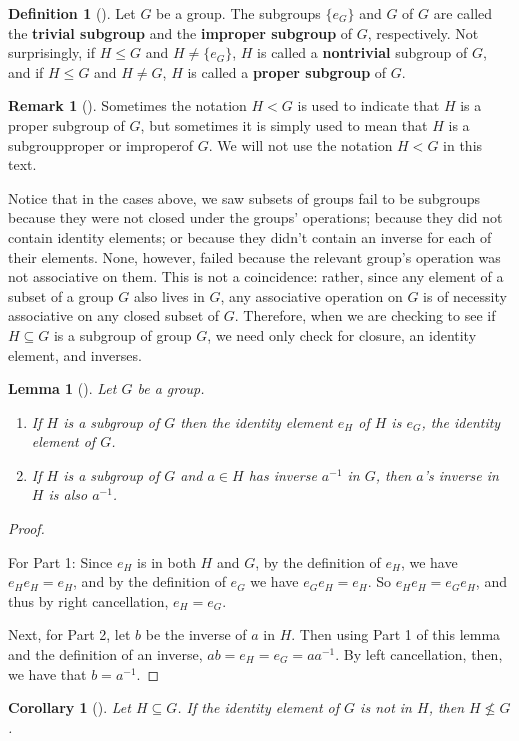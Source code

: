 \documentclass[10pt,openany,oneside]{book}
\newcommand{\terminology}[1]{\textbf{#1}}
\theoremstyle{plain}
\newtheorem{corollary}[theorem]{Corollary}
\newtheorem{lemma}[theorem]{Lemma}
\theoremstyle{definition}
\newtheorem{definition}[theorem]{Definition}
\theoremstyle{definition}
\newtheorem{remark}[theorem]{Remark}
\theoremstyle{definition}
\theoremstyle{definition}
\numberwithin{equation}{section}
\newcommand{\lt}{<}
\begin{document}
\begin{definition}[{}]\label{definition-36}
Let \(G\) be a group. The subgroups \(\{e_G\}\) and \(G\) of \(G\) are called the \terminology{trivial subgroup} and the \terminology{improper subgroup} of \(G\), respectively. Not surprisingly, if \(H\leq G\) and \(H\neq \{e_G\}\), \(H\) is called a \terminology{nontrivial} subgroup of \(G\), and if \(H\leq G\) and \(H\neq G\), \(H\) is called a \terminology{proper subgroup} of \(G\).%
\end{definition}
\begin{remark}[]\label{remark-19}
Sometimes the notation \(H\lt G\) is used to indicate that \(H\) is a proper subgroup of \(G\), but sometimes it is simply used to mean that \(H\) is a subgroup\textemdash{}proper or improper\textemdash{}of \(G\). We will not use the notation \(H\lt G\) in this text.%
\end{remark}
Notice that in the cases above, we saw subsets of groups fail to be subgroups because they were not closed under the groups' operations; because they did not contain identity elements; or because they didn't contain an inverse for each of their elements. None, however, failed because the relevant group's operation was not associative on them. This is not a coincidence: rather, since any element of a subset of a group \(G\) also lives in \(G\), any associative operation on \(G\) is of necessity associative on any closed subset of \(G\). Therefore, when we are checking to see if \(H\subseteq G\) is a subgroup of group \(G\), we need only check for closure, an identity element, and inverses.%
\begin{lemma}[{}]\label{subsame}
Let \(G\) be a group. \leavevmode%
\begin{enumerate}
\item\hypertarget{li-197}{}If \(H\) is a subgroup of \(G\) then the identity element \(e_H\) of \(H\) is \(e_G\), the identity element of \(G\).%
\item\hypertarget{li-198}{}If \(H\) is a subgroup of \(G\) and \(a\in H\) has inverse \(a^{-1}\) in \(G\), then \(a\)'s inverse in \(H\) is also \(a^{-1}\).%
\end{enumerate}
%
\end{lemma}
\begin{proof}\hypertarget{proof-16}{}
For Part 1: Since \(e_H\) is in both \(H\) and \(G\), by the definition of \(e_H\), we have \(e_He_H=e_H\), and by the definition of \(e_G\) we have \(e_Ge_H=e_H\). So \(e_He_H=e_Ge_H\), and thus by right cancellation, \(e_H=e_G\).%
\par
Next, for Part 2, let \(b\) be the inverse of \(a\) in \(H\). Then using Part 1 of this lemma and the definition of an inverse, \(ab=e_H=e_G=aa^{-1}\). By left cancellation, then, we have that \(b=a^{-1}\).%
\end{proof}
\begin{corollary}[{}]\label{corollary-2}
Let \(H\subseteq G\). If the identity element of \(G\) is not in \(H\), then \(H\not\leq G\).%
\end{corollary}
\typeout{************************************************}
\typeout{************************************************}
\end{document}
